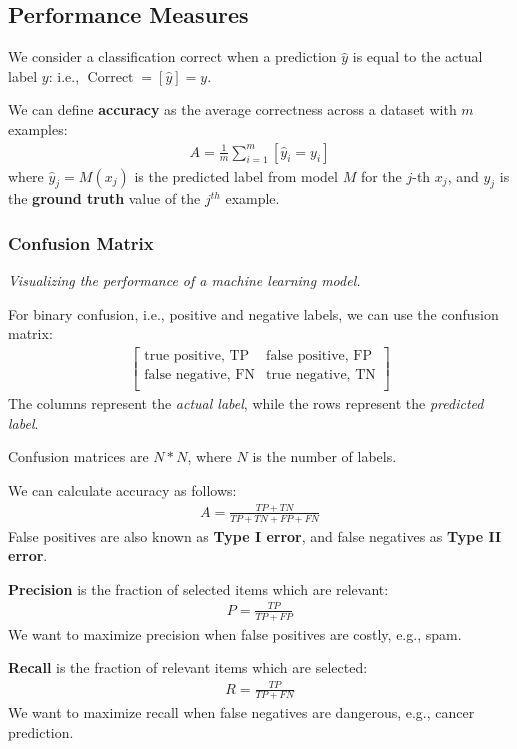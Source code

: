 \subsection{Performance Measures}
We consider a classification correct when a prediction $\hat{y}$ is equal to the actual label $y$:
i.e., $\operatorname{Correct} = [\hat{y}] = y$.

We can define \textbf{accuracy} as the average correctness across a dataset with $m$ examples:
\begin{align*}
    A = \frac{1}{m} \sum_{i=1}^m [\hat{y}_i = y_i]
\end{align*}
where $\hat{y}_j = M(x_j)$ is the predicted label from model $M$ for the $j$-th $x_j$,
and $y_j$ is the \textbf{ground truth} value of the $j^{th}$ example.

\subsubsection{Confusion Matrix}
\emph{Visualizing the performance of a machine learning model.}

For binary confusion, i.e., positive and negative labels, we can use the confusion matrix:
\begin{align*}
    \begin{bmatrix}
        \text{true positive, TP} & \text{false positive, FP} \\
        \text{false negative, FN} & \text{true negative, TN} \\
    \end{bmatrix}
\end{align*}
The columns represent the \emph{actual label}, while the rows represent the \emph{predicted label}.

Confusion matrices are $N * N$, where $N$ is the number of labels.

We can calculate accuracy as follows:
\begin{align*}
    A = \frac{TP + TN}{TP + TN + FP + FN}
\end{align*}
False positives are also known as \textbf{Type I error},
and false negatives as \textbf{Type II error}.

\textbf{Precision} is the fraction of selected items which are relevant:
\begin{align*}
    P = \frac{TP}{TP + FP}
\end{align*}
We want to maximize precision when false positives are costly, e.g., spam.

\textbf{Recall} is the fraction of relevant items which are selected:
\begin{align*}
    R = \frac{TP}{TP + FN}
\end{align*}
We want to maximize recall when false negatives are dangerous, e.g., cancer prediction.

